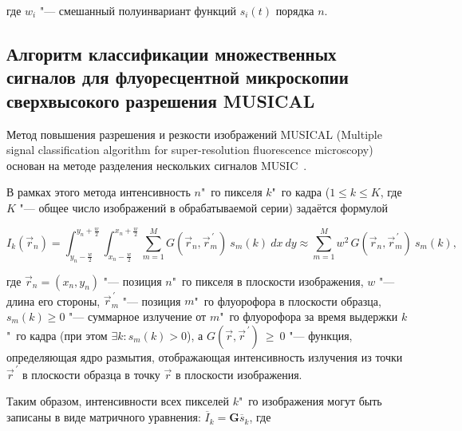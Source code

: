 \noindent где $w_i$ "--- смешанный полуинвариант функций $s_i(t)$ порядка $n$.

\subsection{Алгоритм классификации множественных сигналов для флуоресцентной микроскопии сверхвысокого разрешения MUSICAL}

Метод повышения разрешения и резкости изображений MUSICAL (Multiple signal classification algorithm for super-resolution fluorescence microscopy)~\cite{agarwal2016multiple} основан на методе разделения нескольких сигналов MUSIC~\cite{schmidt1986multiple}.

В рамках этого метода интенсивность $n$"~го пикселя $k$"~го кадра ($1\le k\le K$, где $K$ "--- общее число изображений в обрабатываемой серии) задаётся формулой

\begin{equation}
	I_k\left({\vec{r}}_n\right)=\int_{y_n-\frac{w}{2}}^{y_n+\frac{w}{2}}\int_{x_n-\frac{w}{2}}^{x_n+\frac{w}{2}}\sum_{m=1}^{M}{G\left({\vec{r}}_n,{\vec{r}}_m^{\,\prime}\right)\ s_m\left(k\right)\ dx\ dy}\approx\sum_{m=1}^{M}{w^{2\ }G\left({\vec{r}}_n,{\vec{r}}_m^{\,\prime}\right){\ s}_m\left(k\right)}, \nonumber
\end{equation}	

\noindent где ${\vec{r}}_n=(x_n,y_n)$ "--- позиция $n$"~го пикселя в плоскости изображения, $w$ "--- длина его стороны, ${\vec{r}}_m^{\,\prime}$ "--- позиция $m$"~го флуорофора в плоскости образца, $s_m\left(k\right)\geq0$ "--- суммарное излучение от $m$"~го флуорофора за время выдержки $k$"~го кадра (при этом $\exists k: {s}_m\left(k\right)>0$), а $G\left(\vec{r},{\vec{r}}^{\,\prime}\right)\ \geq\ 0$ "--- функция, определяющая ядро размытия, отображающая интенсивность излучения из точки ${\vec{r}}^{\,\prime}$ в плоскости образца в точку $\vec{r}$ в плоскости изображения.

Таким образом, интенсивности всех пикселей $k$"~го изображения могут быть записаны в виде матричного уравнения: ${\overline{I}}_k=\mathbf{G}{\overline{s}}_k$, где


